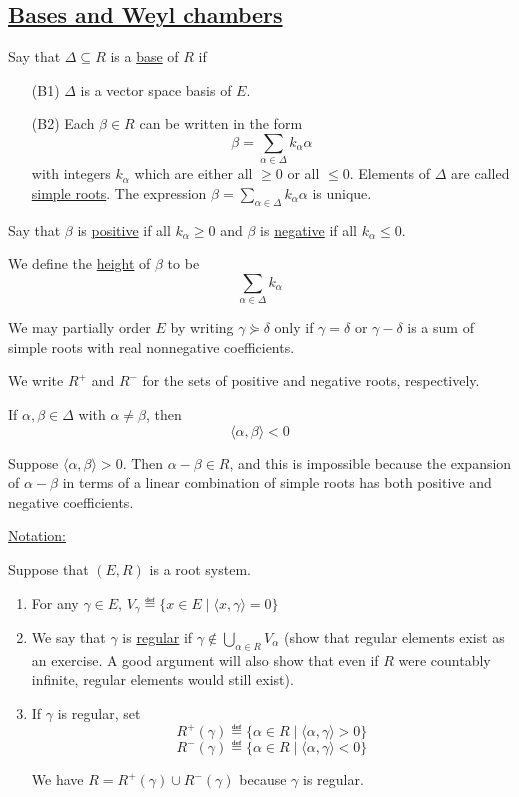 \documentclass[x11names,reqno,14pt]{extarticle}
\begin{document}
\subsection*{\underline{Bases and Weyl chambers}}


Say that $\Delta\subseteq R$ is a \underline{base} of $R$ if 
\begin{itemize}

\item[(B1)] $\Delta$ is a vector space basis of $E$. 

\item[(B2)] Each $\beta\in R$ can be written in the form 
\[
\beta= \sum_{\alpha\in\Delta}k_\alpha\alpha
\]
with integers $k_\alpha$ which are either all $\geq0$ or all $\leq0$. Elements of $\Delta$ are called \underline{simple roots}. The expression $\beta = \sum_{\alpha\in\Delta}k_\alpha\alpha$ is unique.

\end{itemize}

Say that $\beta$ is \underline{positive} if all $k_\alpha\geq0$ and $\beta$ is \underline{negative} if all $k_\alpha\leq0$. 

We define the \underline{height} of $\beta$ to be 
\[
\sum_{\alpha\in\Delta}k_\alpha
\]

We may partially order $E$ by writing $\gamma\curlyeqsucc\delta$ only if $\gamma=\delta$ or $\gamma-\delta$ is a sum of simple roots with real nonnegative coefficients. 

We write $R^+$ and $R^-$ for the sets of positive and negative roots, respectively. 

\prop

If $\alpha,\beta\in\Delta$ with $\alpha\neq\beta$, then 
\[
\langle\alpha,\beta\rangle<0
\]
\proof

Suppose $\langle\alpha,\beta\rangle>0$. Then $\alpha-\beta\in R$, and this is impossible because the expansion of $\alpha-\beta$ in terms of a linear combination of simple roots has both positive and negative coefficients. 

\underline{Notation:}

Suppose that $(E,R)$ is a root system. 
\begin{enumerate}[label=(\alph*)]

\item For any $\gamma\in E$, $V_\gamma \eqdef \{x\in E \mid \langle x, \gamma \rangle = 0 \}$

\item We say that $\gamma$ is \underline{regular} if $\gamma\not\in\bigcup_{\alpha\in R}V_\alpha$ (show that regular elements exist as an exercise. A good argument will also show that even if $R$ were countably infinite, regular elements would still exist).

\item If $\gamma$ is regular, set 
\[
R^+(\gamma) \eqdef\{\alpha\in R \mid \langle\alpha,\gamma\rangle>0\}
\]
\[
R^-(\gamma)\eqdef\{\alpha\in R \mid \langle\alpha,\gamma\rangle<0\}
\]

We have $R = R^+(\gamma) \cup R^-(\gamma)$ because $\gamma$ is regular. 

\end{enumerate}
\end{document}
